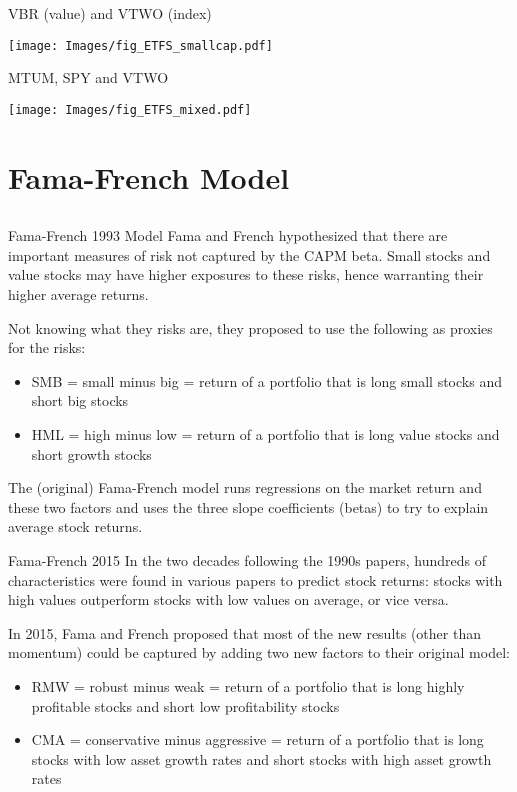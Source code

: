 \documentclass[xcolor=dvipsnames,10pt]{beamer}
\begin{document}
\begin{frame}{VBR (value) and VTWO (index)}
    \begin{center}
        \texttt{[image: Images/fig\_ETFS\_smallcap.pdf]}
    \end{center}
\end{frame}

\begin{frame}{MTUM, SPY and VTWO}
    \begin{center}
        \texttt{[image: Images/fig\_ETFS\_mixed.pdf]}
    \end{center}
\end{frame}



\section{Fama-French Model}\subsection{}

\begin{frame}{Fama-French 1993 Model }
Fama and French hypothesized that there are important measures of risk not captured by the CAPM beta.  Small stocks and value stocks may have higher exposures to these risks, hence warranting their higher average returns.

Not knowing what they risks are, they proposed to use the following as proxies for the risks:
\begin{itemize}
    \item SMB = small minus big = return of a portfolio that is long small stocks and short big stocks
    \item HML = high minus low = return of a portfolio that is long value stocks and short growth stocks
\end{itemize}

The (original) Fama-French model runs regressions on the market return and these two factors and uses the three slope coefficients (betas) to try to explain average stock returns.    
\end{frame}

\begin{frame}{Fama-French 2015}
In the two decades following the 1990s papers, hundreds of characteristics were found in various papers to predict stock returns: stocks with high values outperform stocks with low values on average, or vice versa.

In 2015, Fama and French proposed that most of the new results (other than momentum) could be captured by adding two new factors to their original model:
\begin{itemize}
    \item RMW = robust minus weak = return of a portfolio that is long highly profitable stocks and short low profitability stocks
    \item CMA = conservative minus aggressive = return of a portfolio that is long stocks with low asset growth rates and short stocks with high asset growth rates
\end{itemize}
\end{frame}
\end{document}
